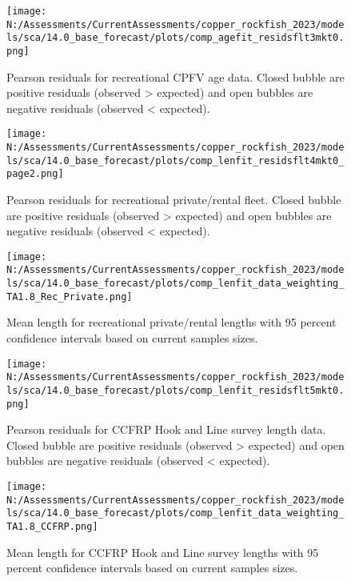 \documentclass[11pt,
  english,
  letterpaper,
]{article}
\begin{document}
\pagebreak

\begin{figure}
\centering
\texttt{[image: N:/Assessments/CurrentAssessments/copper\_rockfish\_2023/models/sca/14.0\_base\_forecast/plots/comp\_agefit\_residsflt3mkt0.png]}
\caption{Pearson residuals for recreational CPFV age data. Closed bubble are positive residuals (observed \textgreater{} expected) and open bubbles are negative residuals (observed \textless{} expected).\label{fig:rec-cpfv-age-pearson}}
\end{figure}

\pagebreak

\begin{figure}
\centering
\texttt{[image: N:/Assessments/CurrentAssessments/copper\_rockfish\_2023/models/sca/14.0\_base\_forecast/plots/comp\_lenfit\_residsflt4mkt0\_page2.png]}
\caption{Pearson residuals for recreational private/rental fleet. Closed bubble are positive residuals (observed \textgreater{} expected) and open bubbles are negative residuals (observed \textless{} expected).\label{fig:rec-pr-pearson}}
\end{figure}

\pagebreak

\begin{figure}
\centering
\texttt{[image: N:/Assessments/CurrentAssessments/copper\_rockfish\_2023/models/sca/14.0\_base\_forecast/plots/comp\_lenfit\_data\_weighting\_TA1.8\_Rec\_Private.png]}
\caption{Mean length for recreational private/rental lengths with 95 percent confidence intervals based on current samples sizes.\label{fig:rec-pr-mean-len-fit}}
\end{figure}

\pagebreak

\begin{figure}
\centering
\texttt{[image: N:/Assessments/CurrentAssessments/copper\_rockfish\_2023/models/sca/14.0\_base\_forecast/plots/comp\_lenfit\_residsflt5mkt0.png]}
\caption{Pearson residuals for CCFRP Hook and Line survey length data. Closed bubble are positive residuals (observed \textgreater{} expected) and open bubbles are negative residuals (observed \textless{} expected).\label{fig:ccfrp-len-pearson}}
\end{figure}

\pagebreak

\begin{figure}
\centering
\texttt{[image: N:/Assessments/CurrentAssessments/copper\_rockfish\_2023/models/sca/14.0\_base\_forecast/plots/comp\_lenfit\_data\_weighting\_TA1.8\_CCFRP.png]}
\caption{Mean length for CCFRP Hook and Line survey lengths with 95 percent confidence intervals based on current samples sizes.\label{fig:ccfrp-mean-len-fit}}
\end{figure}
\end{document}
